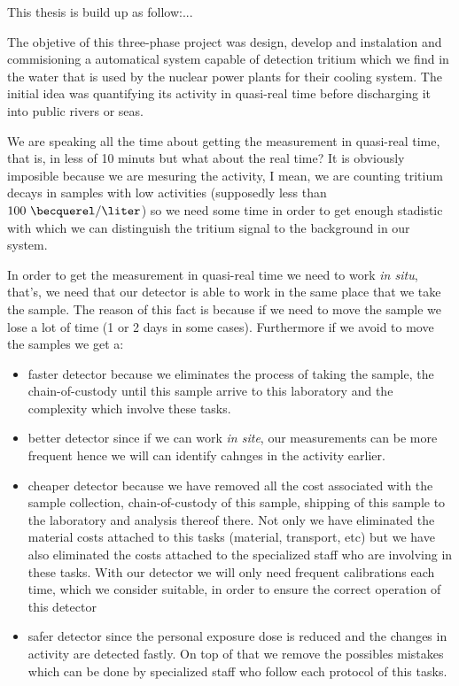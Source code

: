 This thesis is build up as follow:...



The objetive of this three-phase project was design, develop and instalation and commisioning a automatical system capable of detection tritium which we find in the water that is used by the nuclear power plants for their cooling system. The initial idea was quantifying its activity in quasi-real time before discharging it into public rivers or seas. 

We are speaking all the time about getting the measurement in quasi-real time, that is, in less of 10 minuts but what about the real time? It is obviously imposible because we are mesuring the activity, I mean, we are counting tritium decays in samples with low activities (supposedly less than $100~\becquerel/\liter$) so we need some time in order to get enough stadistic with which we can distinguish the tritium signal to the background in our system.

In order to get the measurement in quasi-real time we need to work \textit{in situ}, that's, we need that our detector is able to work in the same place that we take the sample. The reason of this fact is because if we need to move the sample we lose a lot of time (1 or 2 days in some cases). Furthermore if we avoid to move the samples we get a:

\begin{itemize}
\item{} faster detector because we eliminates the process of taking the sample, the chain-of-custody until this sample arrive to this laboratory and the complexity which involve these tasks. 

\item{} better detector since if we can work \textit{in site}, our measurements can be more frequent hence we will can identify cahnges in the activity earlier.

\item{} cheaper detector because we have removed all the cost associated with the sample collection, chain-of-custody of this sample, shipping of this sample to the laboratory and analysis thereof there. Not only we have eliminated the material costs attached to this tasks (material, transport, etc) but we have also eliminated the costs attached to the specialized staff who are involving in these tasks. With our detector we will only need frequent calibrations each time, which we consider suitable, in order to ensure the correct operation of this detector

\item{} safer detector since the personal exposure dose is reduced and the changes in activity are detected fastly. On top of that we remove the possibles mistakes which can be done by specialized staff who follow each protocol of this tasks.

\end{itemize} 

